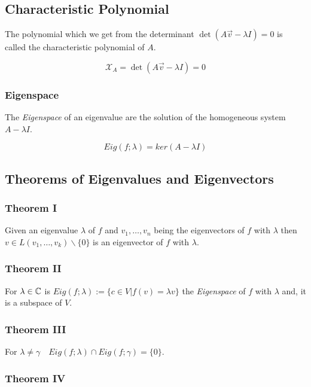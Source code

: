 \subsection{Characteristic Polynomial}

The polynomial which we get from the determinant \(\det (A\vec{v} - \lambda I)  = 0\) is called 
the characteristic polynomial of \(A\).

\[
    \mathcal{X}_A = \det (A\vec{v} - \lambda I) = 0
\]

\subsubsection{Eigenspace}

The \emph{Eigenspace} of an eigenvalue are the solution of the homogeneous system \(A - \lambda I\).

\[
    Eig(f;\lambda) = ker(A - \lambda I)
\]


\subsection{Theorems of Eigenvalues and Eigenvectors}

\subsubsection{Theorem I}

Given an eigenvalue \(\lambda\) of \(f\) and \(v_1, \dots, v_n\) being the eigenvectors of \(f\) 
with \(\lambda\) then \(v \in L(v_1, \dots, v_k) \backslash \{0\}\) is an eigenvector of 
\(f\) with \(\lambda\).
\vspace{\baselineskip}

\subsubsection{Theorem II}

For \(\lambda \in \mathbb{C}\) is \(Eig(f;\lambda):= \{c \in V | f(v) = \lambda v\}\) the \emph{Eigenspace} of 
\(f\) with \(\lambda\) and, it is a subspace of \(V\).

\subsubsection{Theorem III}

For \(\lambda \ne \gamma \quad Eig(f;\lambda) \cap Eig(f;\gamma) = \{0\}\).

\subsubsection{Theorem IV}

